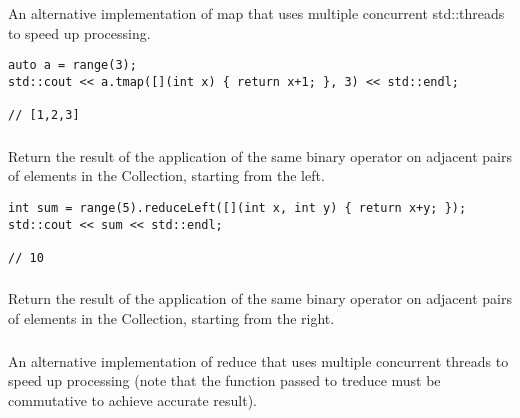 \subsubsection{}

An alternative implementation of map that uses multiple concurrent
std::threads to speed up processing.

\begin{lstlisting}[title=example]
auto a = range(3);
std::cout << a.tmap([](int x) { return x+1; }, 3) << std::endl;

// [1,2,3]
\end{lstlisting}





\subsubsection{}

Return the result of the application of the same binary operator on adjacent pairs of elements in the Collection, starting from the left.

\begin{lstlisting}[title=example]
int sum = range(5).reduceLeft([](int x, int y) { return x+y; });
std::cout << sum << std::endl;

// 10
\end{lstlisting}




\subsubsection{}

Return the result of the application of the same binary operator on adjacent pairs of elements in the Collection, starting from the right.





\subsubsection{}

An alternative implementation of reduce that uses multiple concurrent threads to speed up processing
(note that the function passed to treduce must be commutative to achieve accurate result).

